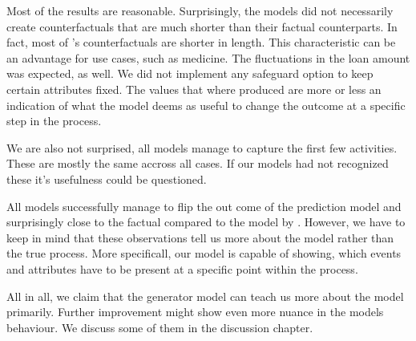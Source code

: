 \documentclass[./../../paper.tex]{subfiles}
\begin{document}
Most of the results are reasonable. Surprisingly, the models did not necessarily create counterfactuals that are much shorter than their factual counterparts. In fact, most of \citeauthor{hsieh_DiCE4ELInterpretingProcess_2021}'s counterfactuals are shorter in length.  This characteristic can be an advantage for use cases, such as medicine. The fluctuations in the loan amount was expected, as well. We did not implement any safeguard option to keep certain attributes fixed. The values that where produced are more or less an indication of what the model deems as useful to change the outcome at a specific step in the process. 

We are also not surprised, all models manage to capture the first few activities. These are mostly the same accross all cases. If our models had not recognized these it's usefulness could be questioned. 

All models successfully manage to flip the out come of the prediction model and surprisingly close to the factual compared to the model by \citeauthor{hsieh_DiCE4ELInterpretingProcess_2021}. However, we have to keep in mind that these observations tell us more about the model rather than the true process. More specificall, our model is capable of showing, which events and attributes have to be present at a specific point within the process. 
   

All in all, we claim that the generator model can teach us more about the model primarily. Further improvement might show even more nuance in the models behaviour. We discuss some of them in the discussion chapter.
\end{document}
